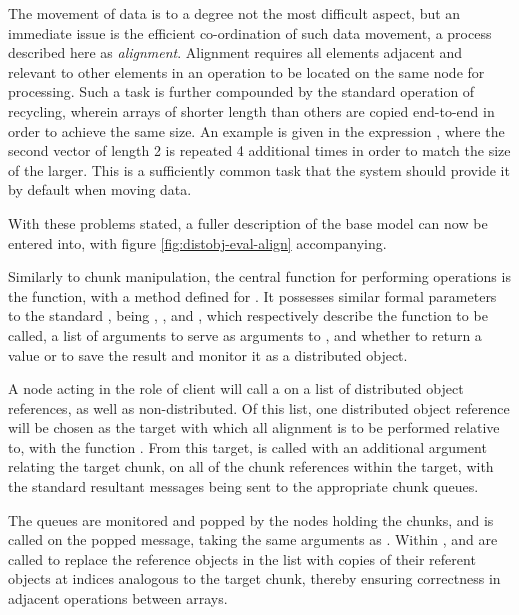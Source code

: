 The movement of data is to a degree not the most difficult aspect, but an
immediate issue is the efficient co-ordination of such data movement, a process
described here as \textit{alignment}.
Alignment requires all elements adjacent and relevant to other elements in an
operation to be located on the same node for processing.
Such a task is further compounded by the standard operation of recycling,
wherein arrays of shorter length than others are copied end-to-end in order to
achieve the same size.
An example is given in the expression , where
the second vector of length 2 is repeated 4 additional times in order to match
the size of the larger.
This is a sufficiently common task that the system should provide it by default
when moving data.

With these problems stated, a fuller description of the base model can now be
entered into, with figure \cref{fig:distobj-eval-align} accompanying.


Similarly to chunk manipulation, the central function for performing operations
is the  function, with a method defined for
. It possesses similar formal parameters to the standard
, being , , and
, which respectively describe the function to be called, a list
of arguments to serve as arguments to , and whether to return a
value or to save the result and monitor it as a distributed object.

A node acting in the role of client will call a
 on a list of distributed object
references, as well as non-distributed.
Of this list, one distributed object reference will be chosen as the target
with which all alignment is to be performed relative to, with the function
.
From this target,  is called with an
additional  argument relating the target chunk, on all of the
chunk references within the target, with the standard resultant messages being
sent to the appropriate chunk queues.

The queues are monitored and popped by the nodes holding the chunks, and
 is called on the popped message, taking the
same arguments as .
Within , 
and  are called to replace the reference
objects in the  list with copies of their referent objects at
indices analogous to the target chunk, thereby ensuring correctness in
adjacent operations between arrays.

